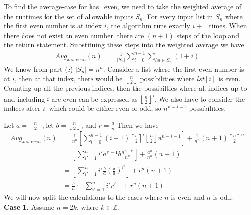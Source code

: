 \documentclass{article}
\begin{document}
\begin{enumerate}
\begin{enumerate}[label=(\alph*)]
            To find the average-case for has\_even, we need to take the 
            weighted average of the runtimes for the set of allowable inputs
            $S_n$. For every input list in $S_n$ where the first even 
            number is at index $i$, the algorithm runs exactly 
            $i + 1$ times. When there does not exist an even number, 
            there are $(n+1)$ steps of the loop and the return statement. 
            Substituing these steps into the weighted average we have
            \begin{align*}
                Avg_{has\_even} (n) &= \frac{1}{|S_n|} \sum_{i=0}^{n-1} 
                \sum_{lst \in S_n} (1+i) \tag*{(Where the first even number is at $i$)} 
            \end{align*}
            We know from part (c) $|S_n| = n^n$. Consider a list where 
            the first even number is at $i$, then at that index, there would 
            be $\left\lfloor \frac{n}{2} \right\rfloor $ possibilities where 
            $lst[i]$ is even. Counting up all the previous indices, then 
            the possibilties where all indices up to and including $i$ are even 
            can be expressed as $\left\lfloor \frac{n}{2} \right\rfloor ^i$. We 
            also have to consider the indices after $i$, which could be either 
            even or odd, so $n^{n-i-1}$ possibilities. 

            Let $a = \left\lceil \frac{n}{2} \right\rceil $,
            let $b = \left\lfloor \frac{n}{2} \right\rfloor$, and
            $r = \frac{a}{n}$ Then we have 
            \begin{align*}
                Avg_{has\_even} (n) &= \frac{1}{n^n} \left[\sum_{i=0}^{n-1} 
                    (i + 1)\left\lceil
                    \frac{n}{2} \right\rceil^{i} \left\lfloor 
                \frac{n}{2}\right\rfloor
        n^{n-i-1} \right] + \frac{1}{n^n}(n+1)\left\lceil  \frac{n}{2} \right\rceil^n \\
                                    &= \left[
                                    \sum_{i'=1}^{n} i' 
                                    a ^{i' -1}
                                    b \frac{n^{n-i'}}{n^n} \right]
                                + \frac{a^n}{n^n} (n+1) \tag*{($i' = i+1$)}\\
                                    &= \left[ \sum_{i'=1}^{n} i' \frac{b}{a} 
                                 \left( \frac{a}{n}\right)^ {i'}\right] 
                                    + r^n (n + 1) \\
                                &= \frac{b}{a}\cdot
                                \left[ \sum_{i' = 1}^{n} i' r^ {i'} \right] 
                                + r^n (n+1)
            \end{align*}
        We will now split 
            the calculations to the cases where $n$ is even and $n$ is odd.
            \newpage
            \textbf{Case 1.} Assume $n = 2k$, where $k \in \mathbb{Z}$.
            

\end{enumerate}
\end{enumerate}
\end{document}

